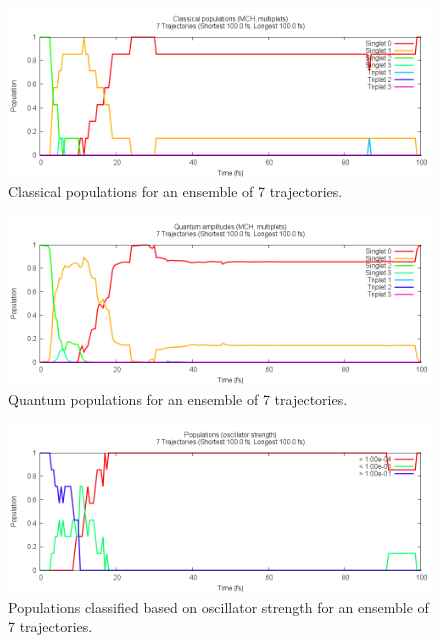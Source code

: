 \documentclass[a4paper,11pt,DIV=15,openany]{scrbook}
\begin{document}
\begin{figure}[ptb]
  \centering
  \includegraphics[width=\textwidth]{figures/pop_class.png}
  \caption{Classical populations for an ensemble of 7 trajectories.}
  \label{fig:pop_class}
\end{figure}
\begin{figure}[ptb]
  \centering
  \includegraphics[width=\textwidth]{figures/pop_quant.png}
  \caption{Quantum populations for an ensemble of 7 trajectories.}
  \label{fig:pop_quant}
\end{figure}
\begin{figure}[ptb]
  \centering
  \includegraphics[width=\textwidth]{figures/pop_fosc.png}
  \caption{Populations classified based on oscillator strength for an ensemble of 7 trajectories.}
  \label{fig:pop_fosc}
\end{figure}
\end{document}
